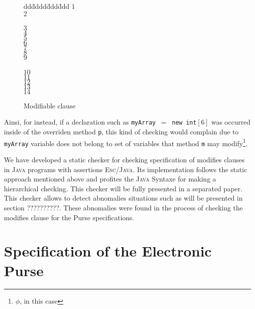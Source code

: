 \documentclass[a4paper]{llncs}
\begin{document}
\begin{figure}[hbt]
\begin{tabbing}
dd\=dddd\=ddd\=ddd \kill
$1$ \\
$2$\> \\
\\
$3$\> \\
$4$\>\> \\
$5$\>\>{ */} \\
$6$\> \\
$7$\>\> \\
$8$\>\> \\
$9$\>\>{\}} \\ \\
 
$10$\> \\
$11$\>\>     \\ 
$12$\>\>{ */} \\
$13$\> \\
$14$\>{\}}
\end{tabbing}
\caption{Modifiable clause}
\label{fig-mod-cas}
\end{figure}

Ainsi, for instead, if a declaration such as \texttt{myArray $=$ new
int$[6]$} was occurred inside of the overriden method \texttt{p}, this 
kind of checking would complain due to \texttt{myArray} variable does not
belong to set of variables that method \texttt{m} may
modify\footnote{$\phi$, in this case}.


We have developed a static checker for checking
specification of modifies clauses in \textsc{Java} programs with
assertions \textsc{Esc/Java}. Its implementation follows the static approach
mentioned above and profites the \textsc{Java} Syntaxe for making a
hierarchical checking. This checker will be fully presented in a
separated paper. This checker allows to detect abnomalies situations
such as will be presented in section ??????????. These abnomalies were 
found in the process of checking the modifies clause for the Purse
specifications. 




\section{Specification of the Electronic Purse}
\label{SectSpecPurse}
\end{document}
